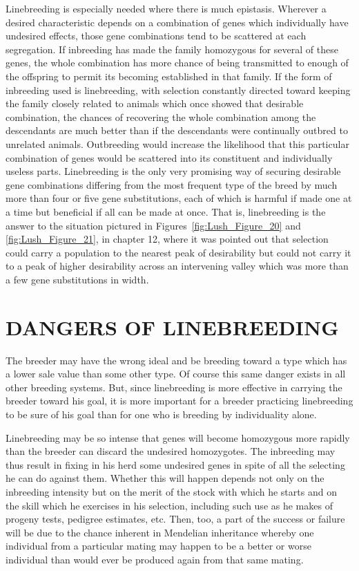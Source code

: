 Linebreeding is especially needed where there is much epistasis.
Wherever a desired characteristic depends on a combination of genes
which individually have undesired effects, those gene combinations
tend to be scattered at each segregation. If inbreeding has made the
family homozygous for several of these genes, the whole combination
has more chance of being transmitted to enough of the offspring to
permit its becoming established in that family. If the form of inbreeding
used is linebreeding, with selection constantly directed toward keeping
the family closely related to animals which once showed that
desirable combination, the chances of recovering the whole combination
among the descendants are much better than if the descendants
were continually outbred to unrelated animals. Outbreeding would
increase the likelihood that this particular combination of genes would
be scattered into its constituent and individually useless parts. Linebreeding
is the only very promising way of securing desirable gene
combinations differing from the most frequent type of the breed by
much more than four or five gene substitutions, each of which is harmful
if made one at a time but beneficial if all can be made at once. That
is, linebreeding is the answer to the situation pictured in
Figures~\ref{fig:Lush_Figure_20} and \ref{fig:Lush_Figure_21}, in chapter
12, where it was pointed out that selection could carry a
population to the nearest peak of desirability but could not carry it to a
peak of higher desirability across an intervening valley which was more
than a few gene substitutions in width.

\section*{DANGERS OF LINEBREEDING}

The breeder may have the wrong ideal and be breeding toward a
type which has a lower sale value than some other type. Of course this
same danger exists in all other breeding systems. But, since linebreeding
is more effective in carrying the breeder toward his goal, it is more
important for a breeder practicing linebreeding to be sure of his goal
than for one who is breeding by individuality alone.

Linebreeding may be so intense that genes will become homozygous
more rapidly than the breeder can discard the undesired homozygotes.
The inbreeding may thus result in fixing in his herd some undesired
genes in spite of all the selecting he can do against them. Whether this
will happen depends not only on the inbreeding intensity but on the
merit of the stock with which he starts and on the skill which he exercises
in his selection, including such use as he makes of progeny tests,
pedigree estimates, etc. Then, too, a part of the success or failure will
be due to the chance inherent in Mendelian inheritance whereby one
individual from a particular mating may happen to be a better or worse
individual than would ever be produced again from that same mating.

